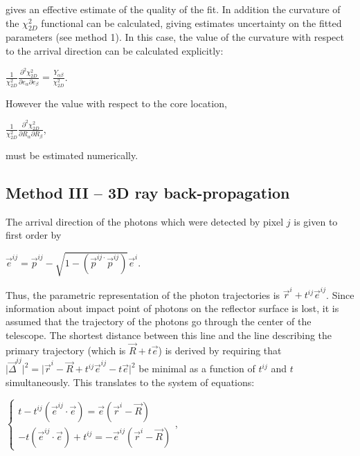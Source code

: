 \documentclass[letterpaper]{article}
\begin{document}
gives an effective estimate of the quality of the fit. In addition the
curvature of the $\chi_{2D}^{2}$ functional can be calculated, giving
estimates uncertainty on the fitted parameters (see method 1). In this
case, the value of the curvature with respect to the arrival direction
can be calculated explicitly:

$\displaystyle \frac{1}{\chi_{2D}^2}\frac{\partial^2\chi_{2D}^2}
{\partial e_\alpha\partial e_\beta} = \frac{Y_{\alpha\beta}}{\chi_{2D}^2}$.

However the value with respect to the core location,

$\displaystyle \frac{1}{\chi_{2D}^2}\frac{\partial^2\chi_{2D}^2}
{\partial R_\alpha\partial R_\beta}$,

must be estimated numerically.

%
%

\subsection{Method III -- 3D ray back-propagation}

The arrival direction of the photons which were detected by pixel $j$
is given to first order by 

$\displaystyle \vec{e}^{ij}=\vec{p}^{ij}
-\sqrt{1-\left(\vec{p}^{ij\cdot}\vec{p}^{ij}\right)}\vec{e}^{i}$. 

Thus, the parametric representation of the photon trajectories is
$\vec{r}^{i}+t^{ij}\vec{e}^{ij}$. Since information about impact point
of photons on the reflector surface is lost, it is assumed that the
trajectory of the photons go through the center of the telescope. The
shortest distance between this line and the line describing the primary
trajectory (which is $\vec{R}+t\vec{e}$) is derived by requiring that
$\vert\vec{\Delta}^{ij}\vert^{2}=\vert\vec{r}^{i}-\vec{R}+t^{ij}\vec{e}
^{ij}-t\vec{e}\vert^{2}$ be minimal as a function of $t^{ij}$ and
$t$ simultaneously. This translates to the system of equations:

$\displaystyle \left\{\begin{array}{l}
t-t^{ij}(\vec{e}^{ij}\cdot\vec{e}) =\vec{e}(\vec{r}^{i}-\vec{R}) \\
-t(\vec{e}^{ij}\cdot\vec{e})+t^{ij}=-\vec{e}^{ij}(\vec{r}^{i}-\vec{R})
\end{array}\right.$,
\end{document}
